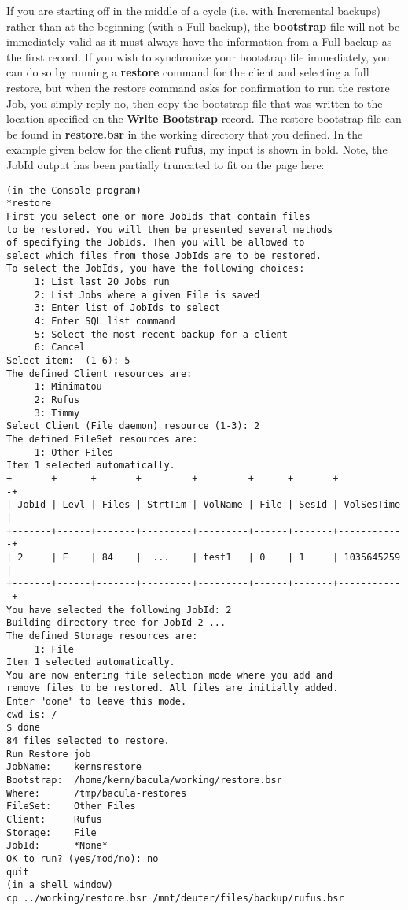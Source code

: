 If you are starting off in the middle of a cycle (i.e. with Incremental
backups) rather than at the beginning (with a Full backup), the {\bf
bootstrap} file will not be immediately valid as it must always have the
information from a Full backup as the first record. If you wish to synchronize
your bootstrap file immediately, you can do so by running a {\bf restore}
command for the client and selecting a full restore, but when the restore
command asks for confirmation to run the restore Job, you simply reply no,
then copy the bootstrap file that was written to the location specified on the
{\bf Write Bootstrap} record. The restore bootstrap file can be found in {\bf
restore.bsr} in the working directory that you defined. In the example given
below for the client {\bf rufus}, my input is shown in bold. Note, the JobId
output has been partially truncated to fit on the page here: 

\footnotesize
\begin{verbatim}
(in the Console program)
*restore
First you select one or more JobIds that contain files
to be restored. You will then be presented several methods
of specifying the JobIds. Then you will be allowed to
select which files from those JobIds are to be restored.
To select the JobIds, you have the following choices:
     1: List last 20 Jobs run
     2: List Jobs where a given File is saved
     3: Enter list of JobIds to select
     4: Enter SQL list command
     5: Select the most recent backup for a client
     6: Cancel
Select item:  (1-6): 5
The defined Client resources are:
     1: Minimatou
     2: Rufus
     3: Timmy
Select Client (File daemon) resource (1-3): 2
The defined FileSet resources are:
     1: Other Files
Item 1 selected automatically.
+-------+------+-------+---------+---------+------+-------+------------+
| JobId | Levl | Files | StrtTim | VolName | File | SesId | VolSesTime |
+-------+------+-------+---------+---------+------+-------+------------+
| 2     | F    | 84    |  ...    | test1   | 0    | 1     | 1035645259 |
+-------+------+-------+---------+---------+------+-------+------------+
You have selected the following JobId: 2
Building directory tree for JobId 2 ...
The defined Storage resources are:
     1: File
Item 1 selected automatically.
You are now entering file selection mode where you add and
remove files to be restored. All files are initially added.
Enter "done" to leave this mode.
cwd is: /
$ done
84 files selected to restore.
Run Restore job
JobName:    kernsrestore
Bootstrap:  /home/kern/bacula/working/restore.bsr
Where:      /tmp/bacula-restores
FileSet:    Other Files
Client:     Rufus
Storage:    File
JobId:      *None*
OK to run? (yes/mod/no): no
quit
(in a shell window)
cp ../working/restore.bsr /mnt/deuter/files/backup/rufus.bsr
\end{verbatim}
\normalsize

